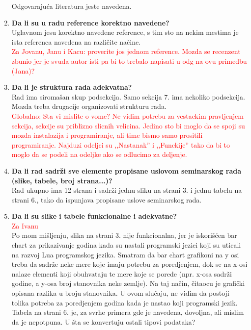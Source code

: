 \documentclass[a4paper]{report}
\newcommand{\note}[1]{\textcolor{red}{#1}}
\begin{document}
\begin{enumerate}
  Odgovaraju\' ca literatura jeste navedena.
\item \textbf {Da li su u radu reference korektno navedene?}\\
  Uglavnom jesu korektno navedene reference, s tim sto na nekim mestima je ista referenca navedena na razli\v cite na\v cine. \\
\note{Za Jovanu, Janu i Kacu: proverite jos jednom reference. Mozda se recenzent zbunio jer je svuda autor isti pa bi to trebalo napisati u odg na ovu primedbu (Jana)?}
\item \textbf {Da li je struktura rada adekvatna?}\\
  Rad ima siroma\v san skup podsekcija. Samo sekcija 7. ima nekoliko podsekcija. Mozda treba drugacije organizovati strukturu rada. \\
\note{Globalno: Sta vi mislite o vome? Ne vidim potrebu za vestackim pravljenjem sekcija, sekcije su priblizno slicnih velicina. Jedino sto bi moglo da se spoji su mozda instalazija i programiranje, ali time bismo samo prositili programiranje. Najduzi odeljci su ,,Nastanak'' i ,,Funckije'' tako da bi to moglo da se podeli na odeljke ako se odlucimo za deljenje.}
\item \textbf {Da li rad sadrži sve elemente propisane uslovom seminarskog rada (slike, tabele, broj strana...)?}\\
  Rad ukupno ima 12 strana i sadr\v zi jednu sliku na strani 3. i jednu tabelu na strani 6., tako da ispunjava propisane uslove seminarskog rada.
\item \textbf {Da li su slike i tabele funkcionalne i adekvatne?}\\ \note{Za Ivanu} \\
  Po mom mi\v sljenju, slika na strani 3. nije funkcionalna, jer je iskori\v s\' cen bar chart za prikazivanje godina kada su nastali programski jezici koji su uticali na razvoj Lua programskog jezika. Smatram da bar chart grafikoni na y osi treba da sadr\v ze neke mere koje imaju potrebu za poredjenjem, dok se na x-osi nalaze elementi koji obuhvataju te mere koje se porede (npr. x-osa sadr\v zi godine, a y-osa broj stanovnika neke zemlje). Na taj na\v cin, \v citaocu je grafi\v cki opisana razlika u
    broju stanovnika. U ovom slu\v caju, ne vidim da postoji tolika potreba za poredjenjem godina kada je nastao koji programski jezik.\\
  Tabela na strani 6. je, za svrhe primera gde je navedena, dovoljna, ali mislim da je nepotpuna. U \v sta se konvertuju ostali tipovi podataka?
\end{enumerate}
\end{document}
